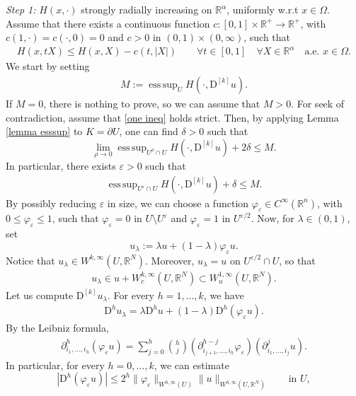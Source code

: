 \documentclass[a4paper,11pt]{article}
\numberwithin{equation}{section}
\newcommand{\numberset}{\mathbb}
\newcommand{\eps}{\varepsilon}
\newcommand{\Om}{\Omega}
\newcommand{\R}{\numberset{R}}
\DeclareMathOperator*{\esssup}{ess\,sup}
\theoremstyle{definition}
\begin{document}
\noindent
\textit{Step 1:} $H(x,\cdot)$ strongly radially increasing on $\R^\alpha$, uniformly w.r.t $x\in \Omega$.\\ 
Assume that there exists a continuous function $c:[0,1]\times\R^+\to\R^+$, with $c(1,\cdot)=c(\cdot,0)=0$ and $c>0$ in $(0,1)\times(0,\infty)$, such that
\begin{align}\label{strong mon}
H(x,tX)\leq H(x,X)-c(t,|X|)\qquad\forall t\in[0,1]\quad\forall X\in\R^\alpha\quad\mbox{a.e. }x\in \Om.
\end{align}
We start by setting 
\begin{align}\label{M}
M:=\esssup_U H(\cdot, \mathrm D ^{[k]}u).
\end{align}
If $M=0$, there is nothing to prove, so we can assume that $M>0$.
For seek of contradiction, assume that \eqref{one ineq} holds strict. Then, by applying Lemma \ref{lemma esssup} to $K=\partial U$, one can find $\delta>0$ such that
$$
\lim_{\rho\to0}\esssup_{U^\rho\cap U}H(\cdot, \mathrm D ^{[k]}u)+2\delta\leq M.
$$
In particular, there exists $\eps>0$ such that
\begin{align}\label{from contr}
\esssup_{U^{\eps}\cap U}H(\cdot, \mathrm D ^{[k]}u)+\delta\leq M.
\end{align}
By possibly reducing $\eps$ in size, we can choose a function $\varphi_\eps\in C^\infty(\R^n)$, with $0\leq\varphi_\eps\leq1$, such that $\varphi_\eps=0$ in $U\setminus U^\eps$ and $\varphi_\eps=1$ in $U^{\eps/2}$. Now, for $\lambda\in(0,1)$, set
$$
u_\lambda:=\lambda u + (1-\lambda)\varphi_\eps u.
$$
Notice that $u_\lambda\in W^{k,\infty}{(U,\R^N)}$. Moreover, $u_\lambda=u$ on $U^{\eps/2}\cap U$, so that 
\begin{align}\label{u lambda}
u_\lambda\in u+W^{k,\infty}_c(U,\R^N)\subset W_u^{1,\infty}(U,\R^N).
\end{align}
Let us compute $\mathrm D^{[k]} u_\lambda$.  For every $h=1,\ldots, k$, we have
\begin{align}\label{deriv product}
\mathrm D^hu_\lambda=\lambda \mathrm D^h u+(1-\lambda)\mathrm D^h(\varphi_\eps u).
\end{align}
By the Leibniz formula,
\begin{align*}
\partial ^h_{i_1,\ldots,i_h}(\varphi_\eps u)=\sum_{j=0}^h \binom{h}{j}(\partial^{h-j}_{i_{j+1},\ldots, i_h} \varphi_\eps)(\partial^{j}_{i_{1},\ldots, i_j} u).
\end{align*}
In particular, for every $h=0,\ldots, k$, we can estimate
$$
|\mathrm D^h(\varphi_\eps u)|\leq 2^h\|\varphi_\eps\|_{W^{h,\infty}(U)}\|u\|_{W^{h,\infty}(U,\R^N)}\qquad \mbox{in }U, 
$$
\end{document}
